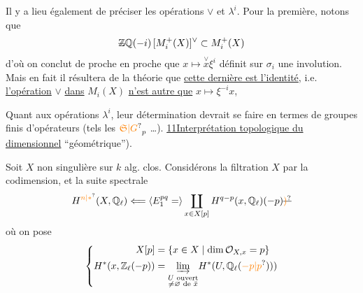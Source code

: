 Il y a lieu également de préciser les opérations $\vee$ et $\lambda^i$. Pour la première, notons que
\[
\deleted{\mathbb Z}\mathbb Q(-i)\,[M_i^+(X)]^\vee\subset M_i^+(X)
\]
d'où on conclut de proche en proche que $x\mapsto\overset{\vee}{x}\xi^i$ définit sur $\sigma_i$ une involution. Mais en fait il résultera de la théorie  que \uline{cette dernière est l'identité}, i.e. \uline{l'opération} $\vee$ \uline{dans}  $M_i(X)$  \uline{n'est autre que} $x\mapsto\xi^{-i}x$, 

Quant aux opérations $\lambda^i$, leur détermination devrait se faire en termes de groupes finis d'opérateurs (tels les $\unsure{\mathfrak S|G}_p$ \dots).
\uline{11}\quad \uline{Interprétation topologique du }  \uline{dimensionnel}  ``géométrique'').

Soit $X$  non singulière sur $k$ alg. clos. Considérons la filtration $X$ par la codimension, et la suite spectrale
\[
H^{\unsure{n|*}}(X,\mathbb Q_\ell)\Longleftarrow\inserted{E_1^{pq}=}\coprod_{x\in X[p]} H^{q-p}(x,\mathbb Q_\ell)(-p)\deleted{\unsure{)}}
\]
où on pose
\[
\left\{\begin{aligned}
X[p]&=\{x\in X\mid\dim\mathcal O_{X,x}=p\}\\
H^*(x,\mathbb Z_\ell(-p))&=\underset{\substack{U\text{ ouvert}\\\ne\varnothing\text{ de }\bar x}}{\underrightarrow{\lim}} H^*(U,\mathbb Q_\ell(\unsure{-p|p})))
\end{aligned}\right.
\]

